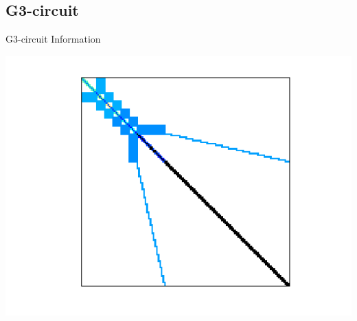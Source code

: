\subsection{G3-circuit}
\begin{table}[h!]
	\begin{minipage}{0.5\linewidth}
		\caption{G3-circuit Information}
		\label{table:cdf1}
		\centering
        
	\end{minipage}\hfill
	\begin{minipage}{0.45\linewidth}
		\centering
		\includegraphics[width=1\textwidth]{figs/G3_circuit.png}
		\label{fig:G3-circuit}
	\end{minipage}
\end{table}



